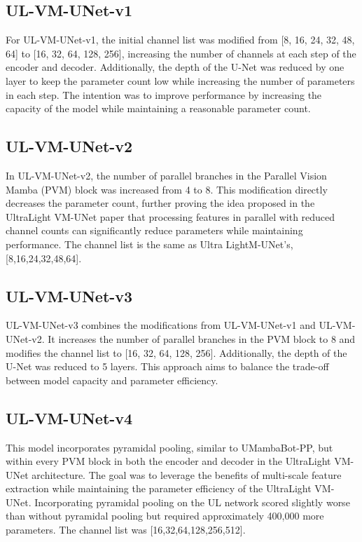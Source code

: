 \documentclass[conference]{IEEEtran}
\begin{document}

\subsection{UL-VM-UNet-v1}
For UL-VM-UNet-v1, the initial channel list was modified from [8, 16, 24, 32, 48, 64] to [16, 32, 64, 128, 256], increasing the number of channels at each step of the encoder and decoder. Additionally, the depth of the U-Net was reduced by one layer to keep the parameter count low while increasing the number of parameters in each step. The intention was to improve performance by increasing the capacity of the model while maintaining a reasonable parameter count.

\subsection{UL-VM-UNet-v2}
In UL-VM-UNet-v2, the number of parallel branches in the Parallel Vision Mamba (PVM) block was increased from 4 to 8. This modification directly decreases the parameter count, further proving the idea proposed in the UltraLight VM-UNet paper \cite{ultralightvmunet} that processing features in parallel with reduced channel counts can significantly reduce parameters while maintaining performance. The channel list is the same as Ultra LightM-UNet's, [8,16,24,32,48,64].

\subsection{UL-VM-UNet-v3}
UL-VM-UNet-v3 combines the modifications from UL-VM-UNet-v1 and UL-VM-UNet-v2. It increases the number of parallel branches in the PVM block to 8 and modifies the channel list to [16, 32, 64, 128, 256]. Additionally, the depth of the U-Net was reduced to 5 layers. This approach aims to balance the trade-off between model capacity and parameter efficiency.

\subsection{UL-VM-UNet-v4}
This model incorporates pyramidal pooling, similar to UMambaBot-PP, but within every PVM block in both the encoder and decoder in the UltraLight VM-UNet architecture. The goal was to leverage the benefits of multi-scale feature extraction while maintaining the parameter efficiency of the UltraLight VM-UNet. Incorporating pyramidal pooling on the UL network scored slightly worse than without pyramidal pooling but required approximately 400,000 more parameters. The channel list was [16,32,64,128,256,512].
\end{document}

